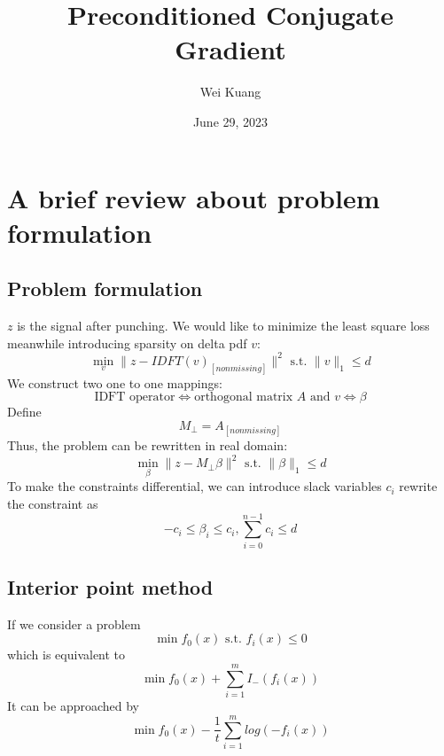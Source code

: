 \documentclass{article}
\title{Preconditioned Conjugate Gradient}
\author{Wei Kuang}
\date{June 29, 2023}
\begin{document}
\maketitle
\section{A brief review about problem formulation}
\subsection{Problem formulation}
$z$ is the signal after punching. We would like to minimize the least square loss meanwhile introducing sparsity on delta pdf $v$:
\begin{equation}
    \min_v \|z-IDFT(v)_{[nonmissing]}\|^2 \text{ s.t. } \|v\|_1\leq d
\end{equation}
We construct two one to one mappings:
\begin{equation}
    \text{IDFT operator} \iff \text{orthogonal matrix }A\text{ and } v\iff \beta
\end{equation}
Define
\begin{equation}
    M_{\perp} = A_{[nonmissing]}
\end{equation}
Thus, the problem can be rewritten in real domain:
\begin{equation}
   \min_{\beta} \|z-M_{\perp}\beta\|^2 \text{ s.t. } \|\beta\|_1\leq d    
\end{equation}
To make the constraints differential, we can introduce slack variables $c_i$ rewrite the constraint as
\begin{equation}
    -c_i\leq \beta_i \leq c_i, \sum_{i=0}^{n-1}c_i \leq d
\end{equation}
\subsection{Interior point method}
If we consider a problem 
\begin{equation}
    \min f_0(x) \text{ s.t. } f_i(x)\leq 0
\end{equation}
which is equivalent to
\begin{equation}
    \min f_0(x) + \sum_{i=1}^m I_{-}(f_i(x))
\end{equation}
It can be approached by
\begin{equation}
    \min f_0(x) -\frac{1}{t} \sum_{i=1}^m log(-f_i(x))
\end{equation}
\end{document}
